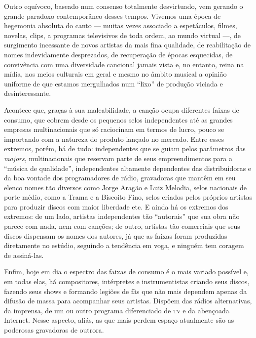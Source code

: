 Outro equívoco, baseado num consenso totalmente desvirtuado, vem gerando
o grande paradoxo contemporâneo desses tempos. Vivemos uma época de
hegemonia absoluta do canto --- muitas vezes associado a espetáculos,
filmes, novelas, clips, a programas televisivos de toda ordem, ao mundo
virtual ---, de surgimento incessante de novos artistas da mais fina
qualidade, de reabilitação de nomes indevidamente desprezados, de
recuperação de épocas esquecidas, de convivência com uma diversidade
cancional jamais vista e, no entanto, reina na mídia, nos meios
culturais em geral e mesmo no âmbito musical a opinião uniforme de que
estamos mergulhados num ``lixo'' de produção viciada e desinteressante.

Acontece que, graças à sua maleabilidade, a canção ocupa diferentes
faixas de consumo, que cobrem desde os pequenos selos independentes até
as grandes empresas multinacionais que só raciocinam em termos de lucro,
pouco se importando com a natureza do produto lançado no mercado. Entre
esses extremos, porém, há de tudo: independentes que se guiam pelos
parâmetros das \emph{majors}, multinacionais que reservam parte de seus
empreendimentos para a ``música de qualidade'', independentes
altamente dependentes das distribuidoras e da boa vontade dos
programadores de rádio, gravadoras que mantêm em seu elenco nomes tão
diversos como Jorge Aragão e Luiz Melodia, selos nacionais de porte
médio, como a Trama e a Biscoito Fino, selos criados pelos próprios
artistas para produzir discos com maior liberdade etc. E ainda há os
extremos dos extremos: de um lado, artistas independentes tão
``autorais'' que sua obra não parece com nada, nem com canções; de
outro, artistas tão comerciais que seus discos dispensam os nomes dos
autores, já que as faixas foram produzidas diretamente no estúdio,
seguindo a tendência em voga, e ninguém tem coragem de assiná-las.

Enfim, hoje em dia o espectro das faixas de consumo é o mais variado
possível e, em todas elas, há compositores, intérpretes e
instrumentistas criando seus discos, fazendo seus shows e formando
legiões de fãs que não mais dependem apenas da difusão de massa para
acompanhar seus artistas. Dispõem das rádios alternativas, da imprensa,
de um ou outro programa diferenciado de \textsc{tv} e da abençoada Internet.
Nesse aspecto, aliás, as que mais perdem espaço atualmente são as
poderosas gravadoras de outrora.

